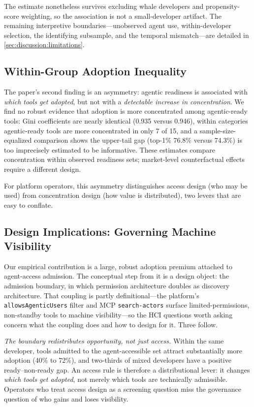 The estimate nonetheless survives excluding whale developers and
propensity-score weighting, so the association is not a small-developer
artifact. The remaining interpretive boundaries---unobserved agent use,
within-developer selection, the identifying subsample, and the temporal
mismatch---are detailed in \autoref{sec:discussion:limitations}.

\subsection{Within-Group Adoption Inequality}
\label{sec:discussion:concentration}

The paper's second finding is an asymmetry: agentic readiness is associated
with \emph{which tools get adopted}, but not with a \emph{detectable increase
in concentration}. We find no robust evidence that adoption is more
concentrated among agentic-ready tools: Gini coefficients are nearly identical
(0.935 versus 0.946), within categories agentic-ready tools are more
concentrated in only 7 of 15, and a sample-size-equalized comparison shows the
upper-tail gap (top-1\% 76.8\% versus 74.3\%) is too imprecisely estimated to
be informative. These estimates compare concentration within observed readiness sets; market-level counterfactual effects require a different design.

For platform operators, this asymmetry distinguishes access design (who may be
used) from concentration design (how value is distributed), two levers that are
easy to conflate.

\subsection{Design Implications: Governing Machine Visibility}
\label{sec:discussion:principles}

Our empirical contribution is a large, robust adoption premium attached to
agent-access admission. The conceptual step from it is a design object: the
admission boundary, in which permission architecture doubles as discovery
architecture. That coupling is partly definitional---the platform's
\texttt{allowsAgenticUsers} filter and MCP \texttt{search-actors} surface
limited-permissions, non-standby tools to machine visibility---so the
HCI questions worth asking concern what the coupling does and how to design for it. Three follow.

\emph{The boundary redistributes opportunity, not just access.} Within the same
developer, tools admitted to the agent-accessible set attract substantially more
adoption (40\% to 72\%), and two-thirds of mixed developers have a positive
ready--non-ready gap. An access rule is therefore a distributional lever: it
changes \emph{which tools get adopted}, not merely which tools are technically
admissible. Operators who treat access design as a screening question miss the
governance question of who gains and loses visibility.

